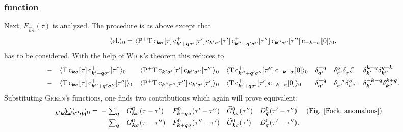 \subsubsection{ function}

Next, $F_{\vec k \sigma}(\tau)$ is analyzed. The procedure is as above except
that
%
\begin{align*}
    \av{\text{el.}}_0= \av{\op P^+ \op T \,
        \op c_{\vec k \sigma}[\tau] \,
        \op c_{\vec k' + \vec q \sigma'}^+[\tau'] \,
        \op c_{\vec k' \sigma'}[\tau'] \,
        \op c_{\vec k'' + \vec q' \sigma''}^+[\tau''] \,
        \op c_{\vec k'' \sigma''}[\tau''] \,
        \op c_{-\vec k -\sigma}[0]}_0.
\end{align*}
%
has to be considered. With the help of \textsc{Wick}'s theorem this reduces to
%
\begingroup
    \def\minalignsep{0pt}
    \begin{align*}
        &-
        && \av{\op T \, \op c_{\vec k \sigma}[\tau]
        \, \op c_{\vec k' + \vec q \sigma'}^+[\tau']}_0
        && \av{\op P^+ \op T \, \op c_{\vec k' \sigma'}[\tau']
        \, \op c_{\vec k'' \sigma''}[\tau'']}_0
        && \av{\op T \, \op c_{\vec k'' + \vec q' \sigma''}^+[\tau'']
        \, \op c_{-\vec k -\sigma}[0]}_0
        && \delta_{\vec q'}^{-\vec q}
        && \delta_{\sigma'}^\sigma \delta_{\sigma''}^{-\sigma}
        && \delta_{\vec k'}^{\vec k - \vec q}
           \delta_{\vec k''}^{\vec q - \vec k} \\
        &-
        && \av{\op T \, \op c_{\vec k \sigma}[\tau]
        \, \op c_{\vec k'' + \vec q' \sigma''}^+[\tau'']}_0
        && \av{\op P^+ \op T \, \op c_{\vec k'' \sigma''}[\tau'']
        \, \op c_{\vec k' \sigma'}[\tau']}_0
        && \av{\op T \, \op c_{\vec k' + \vec q \sigma'}^+[\tau']
        \, \op c_{-\vec k -\sigma}[0]}_0
        && \delta_{\vec q'}^{-\vec q}
        && \delta_{\sigma'}^{-\sigma} \delta_{\sigma''}^\sigma
        && \delta_{\vec k'}^{-\vec k - \vec q}
           \delta_{\vec k''}^{\vec k + \vec q}.
    \end{align*}
\endgroup
%
Substituting \textsc{Green}'s functions, one finds two contributions which again
will prove equivalent:
%
\begin{align*}
    \sum_{\mathclap{\vec k' \vec k'' \sigma' \sigma'' \vec q \vec q'}}
    \av \dots_0 =
    \let\displaystyle\textstyle
    \begin{aligned}[t]
        &- \sum_{\vec q}
        && G^0_{\vec k \sigma}(\tau - \tau')
        && F^0_{\vec k - \vec q \sigma}(\tau' - \tau'')
        && \smash{\widetilde G^0_{\vec k \sigma}}(\tau'')
        && D^0_{\vec q}(\tau' - \tau'')
        &  \text{(Fig.~\ref{Fock, anomalous})} \\
        &- \sum_{\vec q}
        && G^0_{\vec k \sigma}(\tau - \tau'')
        && F^0_{\vec k + \vec q \sigma}(\tau'' - \tau')
        && \smash{\widetilde G^0_{\vec k \sigma}}(\tau')
        && D^0_{\vec q}(\tau' - \tau'').
        &
    \end{aligned}
\end{align*}
